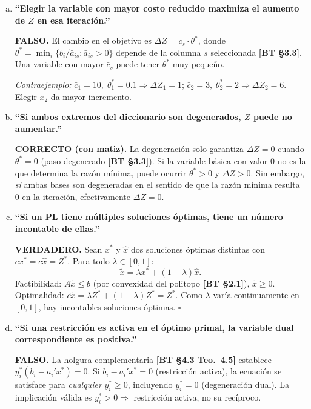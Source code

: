 \documentclass{article}
\begin{document}
\begin{enumerate}[a)]

\item \textbf{``Elegir la variable con mayor costo reducido maximiza el aumento de $Z$ en esa iteración.''}

\textbf{FALSO.} El cambio en el objetivo es $\Delta Z = \bar{c}_s \cdot \theta^*$, donde $\theta^* = \min_i \{b_i / \bar{a}_{is} : \bar{a}_{is} > 0\}$ depende de la columna $s$ seleccionada \textbf{[BT §3.3]}. Una variable con mayor $\bar{c}_s$ puede tener $\theta^*$ muy pequeño.

\textit{Contraejemplo:} $\bar{c}_1 = 10,\; \theta_1^* = 0.1 \Rightarrow \Delta Z_1 = 1$; $\bar{c}_2 = 3,\; \theta_2^* = 2 \Rightarrow \Delta Z_2 = 6$. Elegir $x_2$ da mayor incremento.

\item \textbf{``Si ambos extremos del diccionario son degenerados, $Z$ puede no aumentar.''}

\textbf{CORRECTO (con matiz).} La degeneración solo garantiza $\Delta Z = 0$ cuando $\theta^* = 0$ (paso degenerado \textbf{[BT §3.3]}). Si la variable básica con valor 0 no es la que determina la razón mínima, puede ocurrir $\theta^* > 0$ y $\Delta Z > 0$. Sin embargo, \emph{si} ambas bases son degeneradas en el sentido de que la razón mínima resulta 0 en la iteración, efectivamente $\Delta Z = 0$.

\item \textbf{``Si un PL tiene múltiples soluciones óptimas, tiene un número incontable de ellas.''}

\textbf{VERDADERO.} Sean $x^*$ y $\hat{x}$ dos soluciones óptimas distintas con $cx^* = c\hat{x} = Z^*$. Para todo $\lambda \in [0,1]$:
\[
  \tilde{x} = \lambda x^* + (1-\lambda)\hat{x}.
\]
Factibilidad: $A\tilde{x} \leq b$ (por convexidad del politopo \textbf{[BT §2.1]}), $\tilde{x} \geq 0$. Optimalidad: $c\tilde{x} = \lambda Z^* + (1-\lambda)Z^* = Z^*$. Como $\lambda$ varía continuamente en $[0,1]$, hay incontables soluciones óptimas. $\square$

\item \textbf{``Si una restricción es activa en el óptimo primal, la variable dual correspondiente es positiva.''}

\textbf{FALSO.} La holgura complementaria \textbf{[BT §4.3 Teo.\ 4.5]} establece $y_i^*(b_i - a_i'x^*) = 0$. Si $b_i - a_i'x^* = 0$ (restricción activa), la ecuación se satisface para \emph{cualquier} $y_i^* \geq 0$, incluyendo $y_i^* = 0$ (degeneración dual). La implicación válida es $y_i^* > 0 \Rightarrow$ restricción activa, no su recíproco.


\end{enumerate}
\end{document}
